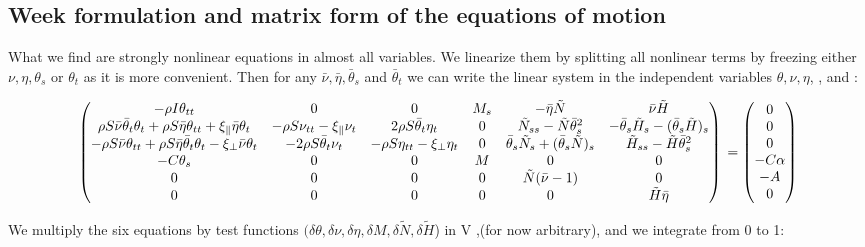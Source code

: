 
\subsection{Week formulation and matrix form of the equations of motion}
What we find are strongly nonlinear equations in almost all variables.
We linearize them by splitting all nonlinear terms by freezing either $\nu, \eta, \theta_s$ or $\theta_t$ as it is more convenient. Then for any $\bar{\nu}, \bar{\eta}, \bar{\theta}_s$ and $\bar{\theta}_t$ we can write the linear system in the independent variables $\theta, \nu, \eta$, ,  and :

\[\begin{pmatrix}
-\rho I \theta_{tt} & 0 & 0 & M_s & -\bar{\eta}\tilde{N} & \bar{\nu}\tilde{H} %
\\
\rho S\bar{\nu}\bar{\theta}_t\theta_t + \rho S \bar{\eta}\theta_{tt} + \xi_{\parallel}\bar{\eta}\theta_t & -\rho S \nu_{tt} -\xi_{\parallel}\nu_t & 2 \rho S\bar{\theta}_t\eta_t & 0 &    \tilde{N}_{ss} - \tilde{N}\bar{\theta}_s^2 & -\bar{\theta}_s \tilde{H}_s - (\bar{\theta}_s \tilde{H})_s 
\\
-\rho S \bar{\nu}\theta_{tt} + \rho S \bar{\eta}\bar{\theta}_t\theta_t - \xi_{\perp}\bar{\nu}\theta_t & - 2\rho S \bar{\theta}_t \nu_t & - \rho S \eta_{tt} - \xi_{\perp}\eta_t & 0 & \bar{\theta}_s \tilde{N}_s + (\bar{\theta}_s \tilde{N})_s & \tilde{H}_{ss}-\tilde{H}\bar{\theta}_s^2 
\\
-C\theta_s & 0 & 0 & M & 0 & 0 
\\
0 & 0 & 0 & 0 & \tilde{N}(\bar{\nu}-1) & 0 
\\
0 & 0 & 0 & 0 & 0 & \tilde{H}\bar{\eta} 
\end{pmatrix}
\\ =
\begin{pmatrix}
0\\
0\\
0\\
-C\alpha\\
-A\\
0
\end{pmatrix}\]


We multiply the six equations by test functions
$(\delta \theta, \delta\nu, \delta \eta, \delta M,\delta \tilde{N}, \delta \tilde{H}$) in V ,(for now arbitrary), and we integrate from 0 to 1: 


